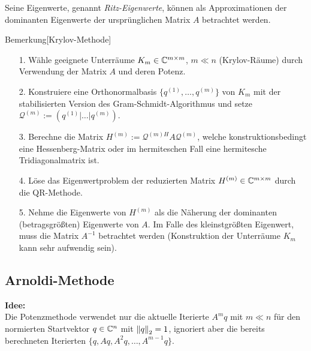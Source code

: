 Seine Eigenwerte, genannt \textit{Ritz-Eigenwerte}, können als Approximationen der dominanten Eigenwerte der 
ursprünglichen Matrix $A$ betrachtet werden. 

\begin{colbox}{Bemerkung}[Krylov-Methode] 
  \begin{enumerate}
    \item[1.] Wähle geeignete Unterräume $K_m\in\mathbb C  ^{m\times m}$, $m\ll n$ (Krylov-Räume) durch Verwendung der 
    Matrix $A$ und deren Potenz.
    \item[2.] Konstruiere eine Orthonormalbasis $\{q^{(1)},\dots, q^{(m)}\}$ von $K_m$ mit der stabilisierten 
    Version des Gram-Schmidt-Algorithmus und setze $\mathcal{Q}^{(m)}:=(q^{(1)}|\dots|q^{(m)})$.
    \item[3.] Berechne die Matrix $H^{(m)}:=\mathcal{Q}^{(m)H}A\mathcal{Q}^{(m)}$, welche 
    konstruktionsbedingt eine Hessenberg-Matrix oder im hermiteschen Fall eine hermitesche Tridiagonalmatrix ist. 
    \item[4.] Löse das Eigenwertproblem der reduzierten Matrix $H^{(m)}\in\mathbb C^{m\times m}$ durch die 
    QR-Methode.
    \item[5.] Nehme die Eigenwerte von $H^{(m)}$ als die Näherung der dominanten (betragsgrößten) Eigenwerte 
    von $A$. Im Falle des kleinstgrößten Eigenwert, muss die Matrix $A^{-1}$ betrachtet werden (Konstruktion 
    der Unterräume $K_m$ kann sehr aufwendig sein).
  \end{enumerate}
\end{colbox}

\subsection{Arnoldi-Methode}
\textbf{Idee:} \\
Die Potenzmethode verwendet nur die aktuelle Iterierte $A^mq$ mit $m\ll n$ für den normierten Startvektor 
$q\in\mathbb C  ^n$ mit $\vertn{2}{q}_2=1$, ignoriert aber die bereits berechneten Iterierten $\{q,Aq,A^2q,\dots,A^{m-1}q\}$.


